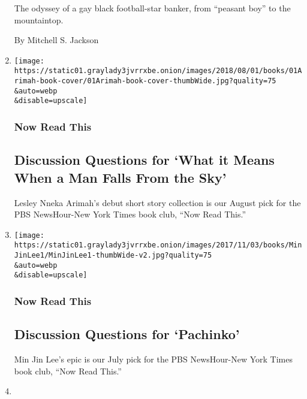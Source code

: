 \begin{enumerate}
  The odyssey of a gay black football-star banker, from ``peasant boy''
  to the mountaintop.

  By Mitchell S. Jackson
\item
  \href{/2018/08/01/books/lesley-nneka-arimah-what-means-when-man-falls-from-sky.html}{}

  \texttt{[image: https://static01.graylady3jvrrxbe.onion/images/2018/08/01/books/01Arimah-book-cover/01Arimah-book-cover-thumbWide.jpg?quality=75\\\&auto=webp\\\&disable=upscale]}

  \hypertarget{now-read-this-9}{%
  \subsubsection{Now Read This}\label{now-read-this-9}}

  \hypertarget{discussion-questions-for-what-it-means-when-a-man-falls-from-the-sky}{%
  \subsection{Discussion Questions for `What it Means When a Man Falls
  From the
  Sky'}\label{discussion-questions-for-what-it-means-when-a-man-falls-from-the-sky}}

  Lesley Nneka Arimah's debut short story collection is our August pick
  for the PBS NewsHour-New York Times book club, ``Now Read This.''
\item
  \href{/2018/07/03/books/discussion-questions-for-pachinko.html}{}

  \texttt{[image: https://static01.graylady3jvrrxbe.onion/images/2017/11/03/books/MinJinLee1/MinJinLee1-thumbWide-v2.jpg?quality=75\\\&auto=webp\\\&disable=upscale]}

  \hypertarget{now-read-this-10}{%
  \subsubsection{Now Read This}\label{now-read-this-10}}

  \hypertarget{discussion-questions-for-pachinko}{%
  \subsection{Discussion Questions for
  `Pachinko'}\label{discussion-questions-for-pachinko}}

  Min Jin Lee's epic is our July pick for the PBS NewsHour-New York
  Times book club, ``Now Read This.''
\item
  \href{/2018/06/15/books/literary-parties-book-expo.html}{}


\end{enumerate}
